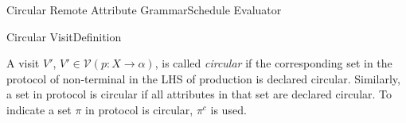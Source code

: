 \begin{frame}{Circular Remote Attribute Grammar}{Schedule Evaluator}

\begin{center}
\end{center}
    
\end{frame}

\begin{frame}{Circular Visit}{Definition}

\begin{definition}\label{def:circular-set-of-occurances}
A visit $V'$, $V' \in \mathscr{V}(p: X \rightarrow \alpha)$, is called \emph{circular} \alert{if the corresponding set in the protocol} of non-terminal in the LHS of production is declared circular. Similarly, a set in protocol is circular if all attributes in that set are declared circular. To indicate a set $\pi$ in protocol is circular, $\pi^c$ is used.
\end{definition}

\end{frame}



